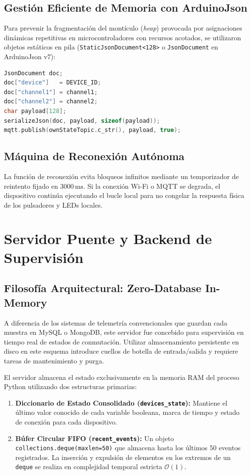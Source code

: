 \documentclass[11pt,a4paper]{article}
\begin{document}
\subsection{Gestión Eficiente de Memoria con ArduinoJson}
Para prevenir la fragmentación del montículo (\textit{heap}) provocada por asignaciones dinámicas repetitivas en microcontroladores con recursos acotados, se utilizaron objetos estáticos en pila (\texttt{StaticJsonDocument<128>} o \texttt{JsonDocument} en ArduinoJson v7):
\begin{lstlisting}[language=C++]
JsonDocument doc;
doc["device"]   = DEVICE_ID;
doc["channel1"] = channel1;
doc["channel2"] = channel2;
char payload[128];
serializeJson(doc, payload, sizeof(payload));
mqtt.publish(ownStateTopic.c_str(), payload, true);
\end{lstlisting}

\subsection{Máquina de Reconexión Autónoma}
La función de reconexión evita bloqueos infinitos mediante un temporizador de reintento fijado en $3000\,\text{ms}$. Si la conexión Wi-Fi o MQTT se degrada, el dispositivo continúa ejecutando el bucle local para no congelar la respuesta física de los pulsadores y LEDs locales.

\section{Servidor Puente y Backend de Supervisión}

\subsection{Filosofía Arquitectural: Zero-Database In-Memory}
A diferencia de los sistemas de telemetría convencionales que guardan cada muestra en MySQL o MongoDB, este servidor fue concebido para supervisión en tiempo real de estados de conmutación. Utilizar almacenamiento persistente en disco en este esquema introduce cuellos de botella de entrada/salida y requiere tareas de mantenimiento y purga.

El servidor almacena el estado exclusivamente en la memoria RAM del proceso Python utilizando dos estructuras primarias:
\begin{enumerate}
    \item \textbf{Diccionario de Estado Consolidado (\texttt{devices\_state}):} Mantiene el último valor conocido de cada variable booleana, marca de tiempo y estado de conexión para cada dispositivo.
    \item \textbf{Búfer Circular FIFO (\texttt{recent\_events}):} Un objeto \texttt{collections.deque(maxlen=50)} que almacena hasta los últimos 50 eventos registrados. La inserción y expulsión de elementos en los extremos de un \texttt{deque} se realiza en complejidad temporal estricta $\mathcal{O}(1)$.
\end{enumerate}
\end{document}
